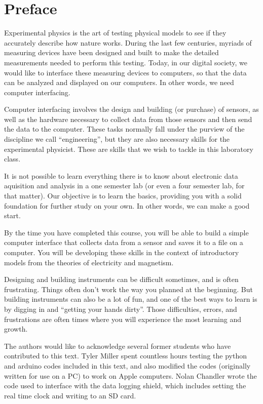 \chapter*{Preface}

Experimental physics is the art of testing physical models to see if they 
accurately describe how nature works. During the last few centuries, myriads 
of measuring devices have been designed and built to make the detailed 
measurements needed to perform this testing. Today, in our digital society,
we would like to interface these measuring devices to computers, so that the 
data can be analyzed and displayed on our computers. In other words, we need 
computer interfacing.

Computer interfacing involves the design and building (or purchase) of sensors,
as well as the hardware necessary to collect data from those sensors and then
send the data to the computer. These tasks normally fall under the purview of
the discipline we call ``engineering'', but they are also necessary skills for
the experimental physicist. These are skills that we wish to tackle in this
laboratory class. 

It is not possible to learn everything there is to know about electronic data
aquisition and analysis in a one semester lab (or even a four semester lab, 
for that matter). Our objective is to learn the basics, providing you with
a solid foundation for further study on your own. In other words, we can make
a good start.

By the time you have completed this course, you will be able to build a simple 
computer interface that collects data from a sensor and saves it to a file on
a computer. You will be developing these skills in the context of introductory
models from the theories of electricity and magnetism.

Designing and building instruments can be difficult sometimes, and is often
frustrating. Things often don't work the way you planned at the beginning. But
building instruments can also be a lot of fun, and one of the best ways to
learn is by digging in and ``getting your hands dirty''. Those difficulties,
errors, and frustrations are often times where you will experience the most
learning and growth.

The authors would like to acknowledge several former students who have
contributed to this text. Tyler Miller spent countless hours testing the 
python and arduino codes included in this text, and also modified the codes
(originally written for use on a PC) to work on Apple computers. Nolan Chandler
wrote the code used to interface with the data logging shield, which includes
setting the real time clock and writing to an SD card.
